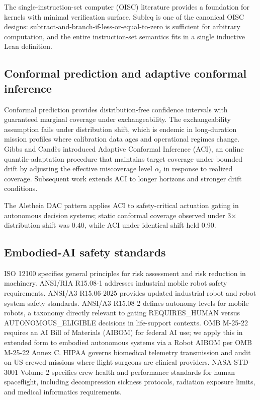 \documentclass[conference]{IEEEtran}
\theoremstyle{definition}
\theoremstyle{plain}
\theoremstyle{remark}
\begin{document}
The single-instruction-set computer (OISC) literature \cite{mavaddat_oisc_1988,nurnberger_oisc_2015} provides a foundation for kernels with minimal verification surface. Subleq is one of the canonical OISC designs: subtract-and-branch-if-less-or-equal-to-zero is sufficient for arbitrary computation, and the entire instruction-set semantics fits in a single inductive Lean definition.

\subsection{Conformal prediction and adaptive conformal inference}

Conformal prediction \cite{vovk_2005_algorithmic,shafer_tutorial_2008} provides distribution-free confidence intervals with guaranteed marginal coverage under exchangeability. The exchangeability assumption fails under distribution shift, which is endemic in long-duration mission profiles where calibration data ages and operational regimes change. Gibbs and Cand{\`e}s \cite{gibbs_aci_2021} introduced Adaptive Conformal Inference (ACI), an online quantile-adaptation procedure that maintains target coverage under bounded drift by adjusting the effective miscoverage level $\alpha_t$ in response to realized coverage. Subsequent work \cite{bhatnagar_aci_2023,zaffran_aci_2022} extends ACI to longer horizons and stronger drift conditions.

The Aletheia DAC pattern \cite{aletheia_internal} applies ACI to safety-critical actuation gating in autonomous decision systems; static conformal coverage observed under 3$\times$ distribution shift was 0.40, while ACI under identical shift held 0.90.

\subsection{Embodied-AI safety standards}

ISO 12100 \cite{iso_12100} specifies general principles for risk assessment and risk reduction in machinery. ANSI/RIA R15.08-1 \cite{ansi_r15081} addresses industrial mobile robot safety requirements. ANSI/A3 R15.06-2025 \cite{ansi_r1506} provides updated industrial robot and robot system safety standards. ANSI/A3 R15.08-2 \cite{ansi_r15082} defines autonomy levels for mobile robots, a taxonomy directly relevant to gating REQUIRES\_HUMAN versus AUTONOMOUS\_ELIGIBLE decisions in life-support contexts. OMB M-25-22 \cite{omb_m2522} requires an AI Bill of Materials (AIBOM) for federal AI use; we apply this in extended form to embodied autonomous systems via a Robot AIBOM per OMB M-25-22 Annex C. HIPAA \cite{hipaa_security} governs biomedical telemetry transmission and audit on US crewed missions where flight surgeons are clinical providers. NASA-STD-3001 Volume 2 \cite{nasa_std_3001_v2} specifies crew health and performance standards for human spaceflight, including decompression sickness protocols, radiation exposure limits, and medical informatics requirements.
\end{document}
